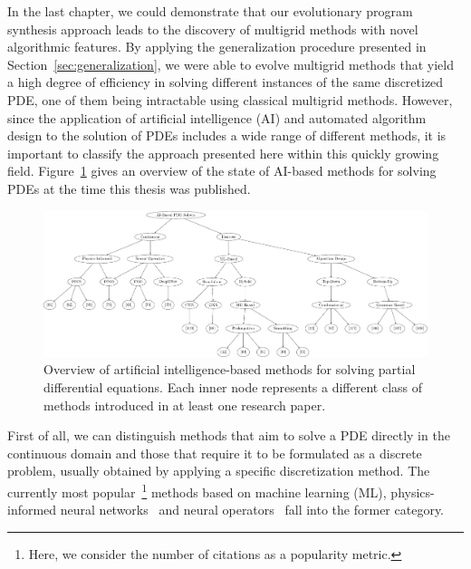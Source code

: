 In the last chapter, we could demonstrate that our evolutionary program synthesis approach leads to the discovery of multigrid methods with novel algorithmic features.
By applying the generalization procedure presented in  Section~\ref{sec:generalization}, we were able to evolve multigrid methods that yield a high degree of efficiency in solving different instances of the same discretized PDE, one of them being intractable using classical multigrid methods.
However, since the application of artificial intelligence (AI) and automated algorithm design to the solution of PDEs includes a wide range of different methods, it is important to classify the approach presented here within this quickly growing field.
Figure~\ref{fig:overview-ai-based-methods} gives an overview of the state of AI-based methods for solving PDEs at the time this thesis was published.
\begin{figure}
	\includegraphics[width=\textwidth]{figures/trees/related_work.pdf}
	\caption[Overview of artificial intelligence-based methods for solving partial differential equations]{Overview of artificial intelligence-based methods for solving partial differential equations. Each inner node represents a different class of methods introduced in at least one research paper.}
	\label{fig:overview-ai-based-methods}
\end{figure}
First of all, we can distinguish methods that aim to solve a PDE directly in the continuous domain and those that require it to be formulated as a discrete problem, usually obtained by applying a specific discretization method.
The currently most popular~\footnote{Here, we consider the number of citations as a popularity metric.} methods based on machine learning (ML), physics-informed neural networks~\cite{karniadakis2021physics,raissi2019physics,kharazmi2019variational,kharazmi2021hp} and neural operators~\cite{li2020fourier,guibas2021efficient,lu2021learning,li2021physics} fall into the former category.
